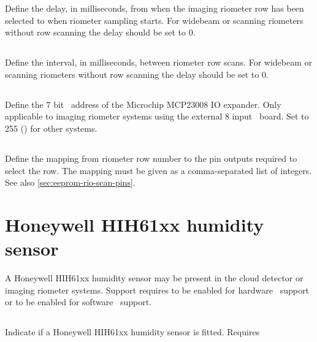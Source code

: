 Define the delay, in milliseconds, from when the imaging riometer row has been
selected to when riometer sampling starts. For widebeam or scanning riometers
without row scanning the delay should be set to 0.

\subsection[rio-row-scan-interval-ms]{}

Define the interval, in milliseconds, between riometer row scans. For widebeam
or scanning riometers without row scanning the delay should be set to 0.

\subsection[rio-gpio-address]{}

Define the 7 bit \itwoc\ address of the Microchip MCP23008 IO expander. Only
applicable to imaging riometer systems using the external 8 input \adc\ board.
Set to 255 () for other systems.

\subsection[rio-scan-mapping]{}
\label{sec:eeprom-rio-scan-mapping}

Define the mapping from riometer row number to the pin outputs required to
select the row. The mapping must be given as a comma-separated list of integers.
See also \ref{sec:eeprom-rio-scan-pins}.
\section{Honeywell HIH61xx humidity sensor}

A Honeywell HIH61xx humidity sensor may be present in the cloud
detector or imaging riometer systems. Support requires
 to be enabled for hardware \itwoc\ support
or  to be enabled for software \itwoc\
support.

\subsection[hih61xx-present]{}

Indicate if a Honeywell HIH61xx humidity sensor is fitted. Requires


